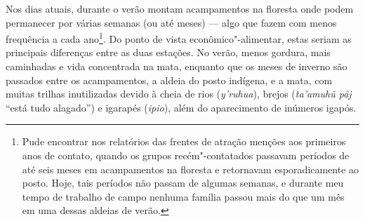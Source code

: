 Nos dias atuais, durante o verão montam acampamentos na floresta onde
podem permanecer por várias semanas (ou até meses) --- algo que fazem com
menos frequência a cada ano\footnote{Pude encontrar nos relatórios das
  frentes de atração menções aos primeiros anos de contato, quando os
  grupos recém"-contatados passavam períodos de até seis meses em
  acampamentos na floresta e retornavam esporadicamente ao posto. Hoje,
  tais períodos não passam de algumas semanas, e durante meu tempo de
  trabalho de campo nenhuma família passou mais do que um mês em uma
  dessas aldeias de verão.}. Do ponto de vista econômico"-alimentar,
estas seriam as principais diferenças entre as duas estações. No verão,
menos gordura, mais caminhadas e vida concentrada na mata, enquanto que
os meses de inverno são passados entre os acampamentos, a aldeia do
posto indígena, e a mata, com muitas trilhas inutilizadas devido à cheia
de rios (\emph{y'ruhua}), brejos (\emph{ta'amuhũ pãj} ``está tudo
alagado'') e igarapés (\emph{ipio}), além do aparecimento de inúmeros
igapós.


